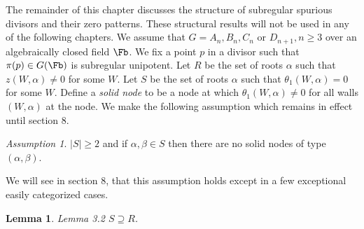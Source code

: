 \documentclass{memo-l}
\newtheorem{lemma}[theorem]{Lemma}
\theoremstyle{definition}
\theoremstyle{remark}
\newtheorem{assumption}[theorem]{Assumption}
\numberwithin{section}{chapter}
\numberwithin{equation}{chapter}
\begin{document}
The remainder of this chapter discusses the structure of subregular spurious
divisors and their zero patterns.  These structural results will not be
used in any of the following chapters.  We assume that $G = A_{n}, B_{n},
C_{n}$ or $D_{n+1}, n \ge  3$ over an algebraically closed field $\Fb$.
We fix a point $p$ in a divisor such that ${\pi}(p) \in G(\Fb)$ is
subregular unipotent.  Let $R$ be the set of roots ${\alpha}$ such that
$z(W,{\alpha})\ne 0$ for some $W$.  Let $S$ be the set of roots ${\alpha}$
such that ${\theta}_{1}(W,{\alpha}) = 0$ for some $W$.  Define a {\it solid
node} to be a node at which ${\theta}_{1}(W,{\alpha})\ne 0$ for all walls
$(W,{\alpha})$ at the node.  We make the following assumption which remains
in effect until section $8$.


\begin{assumption}  %
$\vert S\vert \ge 2$ and if ${\alpha},
{\beta} \in S$ then there are no solid nodes of type
$({\alpha},{\beta})$.
\end{assumption}

   We will see in section $8$, that this assumption holds except in a few
exceptional easily categorized cases.

\medpagebreak

\begin{lemma}{Lemma 3.2}  $S {\supseteq} R$.
\end{lemma}

\medpagebreak
\end{document}
